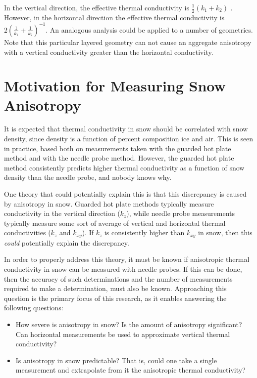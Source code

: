 In the vertical direction, the effective thermal conductivity is
\(\frac12(k_1 + k_2)\) \cite{lunardini}. However, in the horizontal direction the effective
thermal conductivity is \(2\left( \frac1{k_1} + \frac1{k_2} \right)^{-1}\). An
analogous analysis could be applied to a number of geometries. Note that this
particular layered geometry can not cause an aggregate anisotropy with a
vertical conductivity greater than the horizontal conductivity.


\section{Motivation for Measuring Snow Anisotropy}

It is expected that thermal conductivity in snow should be correlated with snow
density, since density is a function of percent composition ice and air.
\cite{pitman} This is seen in practice, based both on measurements taken with
the guarded hot plate method and with the needle probe method. However, the
guarded hot plate method consistently predicts higher thermal conductivity as a
function of snow density than the needle probe, and nobody knows why.

One theory that could potentially explain this is that this discrepancy is
caused by anisotropy in snow.  Guarded hot plate methods typically measure
conductivity in the vertical direction (\(k_z\)), while needle probe
measurements typically measure some sort of average of vertical and horizontal
thermal conductivities (\(k_z\) and \(k_{xy}\)). If \(k_z\) is consistently
higher than \(k_{xy}\) in snow, then this \emph{could} potentially explain
the discrepancy.

In order to properly address this theory, it must be known if anisotropic
thermal conductivity in snow can be measured with needle probes. If this can be
done, then the accuracy of such determinations and the number of measurements
required to make a determination, must also be known. Approaching this question
is the primary focus of this research, as it enables answering the following
questions:

\begin{itemize}
\item How severe is anisotropy in snow? Is the amount of anisotropy
significant? Can horizontal measurements be used to approximate vertical thermal
conductivity?
\item Is anisotropy in snow predictable? That is, could one take a single
measurement and extrapolate from it the anisotropic thermal conductivity?
\end{itemize}

